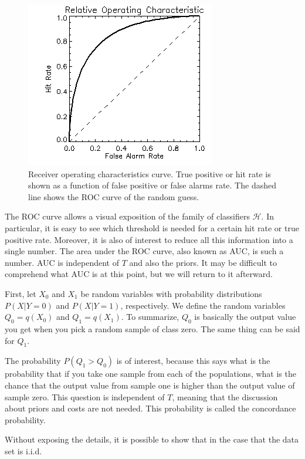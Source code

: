 \begin{figure}[ht!]
\centering
\includegraphics[scale=0.70]{fig/ROC}
\caption{\label{fig:ROC}Receiver operating characteristics curve.  True positive or hit rate is shown as a function of false positive or false alarms rate.  The dashed line shows the ROC curve of the random guess.}
\end{figure}


The ROC curve allows a visual exposition of the family of classifiers $\mathcal{H}$.  In particular, it is easy to see which threshold is needed for a certain hit rate or true positive rate.  Moreover, it is also of interest to reduce all this information into a single number.  The area under the ROC curve, also known as AUC, is such a number.  
AUC is independent of $T$ and also the priors.  It may be difficult to comprehend what AUC is at this point, but we will return to it afterward.

First, let $X_0$ and $X_1$ be random variables with probability distributions $P(X | Y = 0)$ and $P(X | Y = 1)$, respectively.  We define the random variables $Q_0 = q(X_0)$ and $Q_1 = q(X_1)$.  To summarize, $Q_0$ is basically the output value you get when you pick a random sample of class zero. The same thing can be said for $Q_1$.  

The probability $P(Q_1 > Q_0)$ is of interest, because this says what is the probability that if you take one sample from each of the populations, what is the chance that the output value from sample one is higher than the output value of sample zero.  This question is independent of $T$, meaning that the discussion about priors and costs are not needed. This probability is called the concordance probability.

Without exposing the details, it is possible to show that in the case that the data set is i.i.d.


